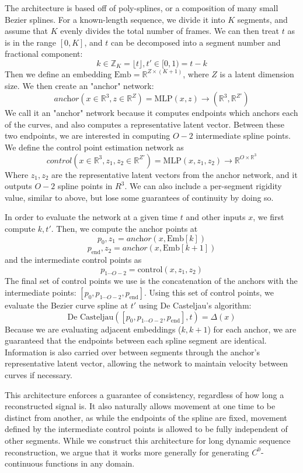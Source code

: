 The architecture is based off of poly-splines, or a composition of many small Bezier splines.
For a known-length sequence, we divide it into $K$ segments, and assume that $K$ evenly divides the total number of frames. We can then treat $t$ as is
in the range $[0, K]$, and $t$ can be decomposed into a segment number and fractional component:
\[ k\in\mathbb{Z}_K=\lfloor t\rfloor, t'\in[0,1)=t-k \]
Then we define an embedding $\text{Emb} = \mathbb{R}^{Z\times(K+1)}$, where $Z$ is a latent
dimension size. We then create an "anchor" network:
\[
    \textit{anchor}(x\in\mathbb{R}^3,z\in\mathbb{R}^Z) = \text{MLP}(x,z)\to(\mathbb{R}^3,\mathbb{R}^{Z'})
\]
We call it an "anchor" network because it computes
endpoints which anchors each of the curves, and also computes a representative latent vector. Between these two
endpoints, we are interested in computing $O-2$ intermediate spline points. We define the
control point estimation network as
\[
\textit{control}(x\in\mathbb{R}^3, z_1, z_2\in\mathbb{R}^{Z'}) = \text{MLP}(x,z_1,z_2)\to\mathbb{R}^{O\times\mathbb{R}^3}
\]
Where $z_1,z_2$ are the
representative latent vectors from the anchor network, and it outputs $O-2$ spline points in
$R^3$. We can also include a per-segment rigidity value, similar to above, but lose
some guarantees of continuity by doing so.

In order to evaluate the network at a given time $t$ and other inputs $x$, we first compute $k, t'$. Then, we compute
the anchor points at
\[ p_0,z_1=\textit{anchor}(x,\text{Emb}[k]) \]
\[ p_\text{end},z_2=\textit{anchor}(x,\text{Emb}[k+1]) \]
and the intermediate control points as \[ p_{1\cdots O-2} = \text{control}(x,z_1,z_2) \]
The final set of control points we use
is the concatenation of the anchors with the intermediate points:
$[p_0, p_{1\cdots O-2}, p_\text{end}]$. Using this set of control points, we evaluate the Bezier
curve spline at $t'$ using De Casteljau's algorithm:
\[ \text{De Casteljau}([p_0, p_{1\cdots O-2}, p_\text{end}], t) = \Delta(x) \]
Because we are evaluating adjacent embeddings ($k, k+1$) for each anchor, we are guaranteed that the endpoints between each spline segment are identical. Information is also carried over between segments through the anchor's
representative latent vector, allowing the network to maintain velocity between curves if necessary.

This architecture enforces a guarantee of consistency, regardless of how long a reconstructed signal is. It also naturally allows movement at one time to be distinct from another,
as while the endpoints of the spline are fixed, movement defined by the intermediate control points is allowed to be fully independent of other
segments. While we construct this architecture for long dynamic sequence reconstruction, we argue that it works more generally for generating $C^0$-continuous functions in any domain.

